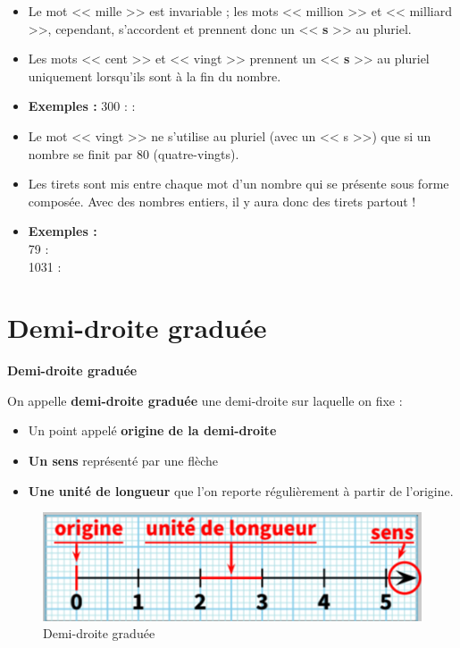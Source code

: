 \begin{itemize}
	\item Le mot << mille >> est invariable ; les mots << million >> et << milliard >>, cependant, s'accordent et prennent donc un << \textbf{s} >> au pluriel.
	\item Les mots << cent >> et << vingt >> prennent un << \textbf{s} >> au pluriel uniquement lorsqu'ils sont à la fin du nombre.
	\item \textbf{Exemples :} 300 : \trous{5cm}  : \trous{5cm}
	\item Le mot << vingt >> ne s'utilise au pluriel (avec un << s >>) que si un nombre se finit par 80 (quatre-vingts).
	\item Les tirets sont mis entre chaque mot d'un nombre qui se présente sous forme composée. Avec des nombres entiers, il y aura donc des tirets partout !
	\item \textbf{Exemples :} \\
	79 : \trous{6cm} \\
	1031 : \trous{6cm}
\end{itemize}

\section{Demi-droite graduée}

\begin{definitionbox}
	\textbf{Demi-droite graduée}
	
	On appelle \textbf{demi-droite graduée} une demi-droite sur laquelle on fixe :
	\begin{itemize}[label = \textbullet]
		\item Un point appelé \textbf{origine de la demi-droite}
		\item \textbf{Un sens} représenté par une flèche
		\item \textbf{Une unité de longueur} que l'on reporte régulièrement à partir de l'origine.
	\end{itemize}
\end{definitionbox}

\begin{figure}[h]
	\centering
	\includegraphics[width=0.6\linewidth]{../../assets/images/6e/seq_01/demi-droite-graduee.png}
	\caption{Demi-droite graduée}
	\label{fig:demi-droite-graduee}
\end{figure}

